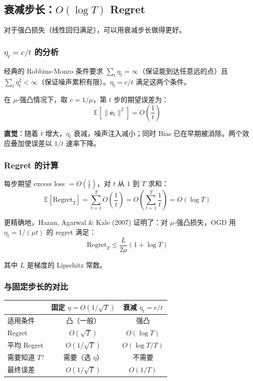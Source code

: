 \documentclass[12pt, a4paper]{ctexart}
\begin{document}
\subsection{衰减步长：$O(\log T)$ Regret}

对于强凸损失（线性回归满足），可以用衰减步长做得更好。

\subsubsection{$\eta_t = c/t$ 的分析}

经典的 Robbins-Monro 条件要求 $\sum_t \eta_t = \infty$（保证能到达任意远的点）且 $\sum_t \eta_t^2 < \infty$（保证噪声累积有限）。$\eta_t = c/t$ 满足这两个条件。

在 $\mu$-强凸情况下，取 $c = 1/\mu$，第 $t$ 步的期望误差为：
\begin{equation}
    \mathbb{E}[\|\mathbf{e}_t\|^2] = O\!\left(\frac{1}{t}\right)
\end{equation}

\textbf{直觉}：随着 $t$ 增大，$\eta_t$ 衰减，噪声注入减小；同时 Bias 已在早期被消除。两个效应叠加使误差以 $1/t$ 速率下降。

\subsubsection{Regret 的计算}

每步期望 excess loss $= O(\frac{1}{t})$，对 $t$ 从 $1$ 到 $T$ 求和：
\begin{equation}
    \mathbb{E}[\mathrm{Regret}_T] = \sum_{t=1}^T O\!\left(\frac{1}{t}\right) = O\!\left(\sum_{t=1}^T \frac{1}{t}\right) = O(\log T)
\end{equation}

更精确地，Hazan, Agarwal \& Kale (2007) 证明了：对 $\mu$-强凸损失，OGD 用 $\eta_t = 1/(\mu t)$ 的 regret 满足：
\begin{equation}
    \boxed{\mathrm{Regret}_T \leq \frac{L}{2\mu}\left(1 + \log T\right)}
\end{equation}

其中 $L$ 是梯度的 Lipschitz 常数。

\subsubsection{与固定步长的对比}

\begin{center}
\begin{tabular}{l|cc}
 & 固定 $\eta = O(1/\sqrt{T})$ & 衰减 $\eta_t = c/t$ \\
\hline
适用条件 & 凸（一般） & 强凸 \\
Regret & $O(\sqrt{T})$ & $O(\log T)$ \\
平均 Regret & $O(1/\sqrt{T})$ & $O(\log T / T)$ \\
需要知道 $T$? & 需要（选 $\eta$） & 不需要 \\
最终误差 & $O(1/\sqrt{T})$ & $O(1/T)$ \\
\end{tabular}
\end{center}
\end{document}
